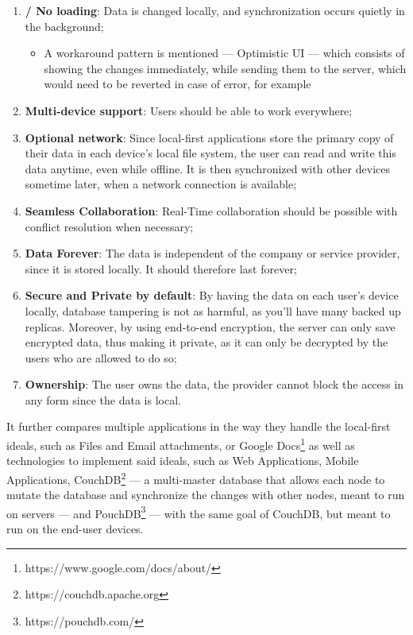 \begin{enumerate}
    \item \textbf{ / No loading}: Data is changed locally, and synchronization occurs quietly in the background;
    \begin{itemize}
        \item A workaround pattern is mentioned --- Optimistic UI --- which consists of showing the changes immediately, while sending them to the server, which would need to be reverted in case of error, for example
    \end{itemize}
    \item \textbf{Multi-device support}: Users should be able to work everywhere;
    \item \textbf{Optional network}: Since local-first applications store the primary copy of their data in each device’s local file system, the user can read and write this data anytime, even while offline. It is then synchronized with other devices sometime later, when a network connection is available;
    \item \textbf{Seamless Collaboration}: Real-Time collaboration should be possible with conflict resolution when necessary;
    \item \textbf{Data Forever}: The data is independent of the company or service provider, since it is stored locally. It should therefore last forever;
    \item \textbf{Secure and Private by default}: By having the data on each user's device locally, database tampering is not as harmful, as you'll have many backed up replicas. Moreover, by using end-to-end encryption, the server can only save encrypted data, thus making it private, as it can only be decrypted by the users who are allowed to do so;
    \item \textbf{Ownership}: The user owns the data, the provider cannot block the access in any form since the data is local.
\end{enumerate}

It further compares multiple applications in the way they handle the local-first ideals, such as Files and Email attachments, or Google Docs\footnote{https://www.google.com/docs/about/} as well as technologies to implement said ideals, such as Web Applications, Mobile Applications, CouchDB\footnote{https://couchdb.apache.org} --- a multi-master database that allows each node to mutate the database and synchronize the changes with other nodes, meant to run on servers --- and PouchDB\footnote{https://pouchdb.com/} --- with the same goal of CouchDB, but meant to run on the end-user devices.

